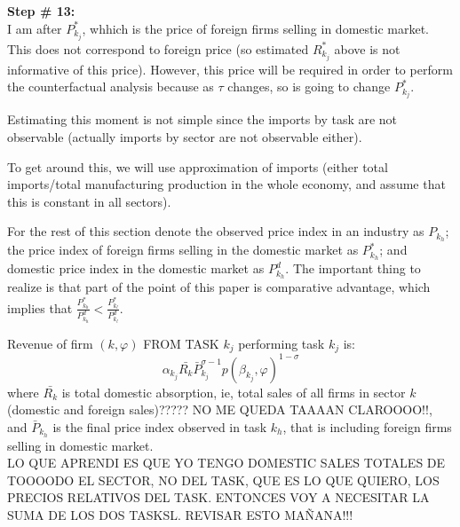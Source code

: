 \documentclass[12pt]{article}
\begin{document}
\raggedright
\pagebreak
{\bf Step \# 13:}\\
I am after $P^*_{k_j}$, whhich is the price of foreign firms selling in domestic market. This does not correspond to foreign price (so estimated $R_{k_j}^*$ above is not informative of this price). However, this price will be required in order to perform the counterfactual analysis because as $\tau$ changes, so is going to change $P_{k_j}^*$.\\ \bigskip

Estimating this moment is not simple since the imports by task are not observable (actually imports by sector are not observable either). \\ \bigskip

To get around this, we will use approximation of imports (either total imports/total manufacturing production in the whole economy, and assume that this is constant in all sectors). \\ \bigskip

For the rest of this section denote the observed price index in an industry as $P_{k_h}$; the price index of foreign firms selling in the domestic market as $P^*_{k_h}$; and domestic price index in the domestic market as $P^d_{k_h}$. 
The important thing to realize is that part of the point of this paper is comparative advantage, which implies that  $\frac{P^*_{k_h}}{P^d_{k_h}} < \frac{P^*_{k_l}}{P^d_{k_l}}$.

Revenue of firm $(k,\varphi)$ FROM TASK $k_j$ performing task $k_j$ is:
$$\alpha_{k_j}\bar{R_k}\bar{P}_{k_j}^{\sigma-1}p(\beta_{k_j},\varphi)^{1-\sigma}$$
where $\bar{R_k}$ is total domestic absorption, ie, total sales of all firms in sector $k$ (domestic and foreign sales)????? NO ME QUEDA TAAAAN CLAROOOO!!, and $\bar{P}_{k_h}$ is the final price index observed in task $k_h$, that is including foreign firms selling in domestic market. \\

LO QUE APRENDI ES QUE YO TENGO DOMESTIC SALES TOTALES DE TOOOODO EL SECTOR, NO DEL TASK, QUE ES LO QUE QUIERO, LOS PRECIOS RELATIVOS DEL TASK. ENTONCES VOY A NECESITAR LA SUMA DE LOS DOS TASKSL. REVISAR ESTO MAÑANA!!!\\
\end{document}
